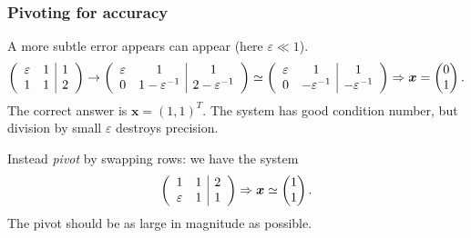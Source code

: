 \documentclass{beamer}
\newcommand{\bx}{{\boldsymbol{x}}}
\begin{document}
\begin{frame}
  \frametitle{Pivoting for accuracy}
  
  A more subtle error appears can appear (here $\varepsilon \ll 1$).
  {\footnotesize
  \begin{equation*}
    \left(
      \begin{array}{c c|c}
        \varepsilon & 1 & 1 \\
        1 & 1 & 2
      \end{array}
      \right) \rightarrow     
      \left(
      \begin{array}{c c|c}
        \varepsilon & 1 & 1 \\
        0 & 1 - \varepsilon^{-1} & 2 - \varepsilon^{-1}
      \end{array}
    \right) \simeq
    \left(
      \begin{array}{c c|c}
        \varepsilon & 1 & 1 \\
        0 & - \varepsilon^{-1} & - \varepsilon^{-1}
      \end{array}
    \right) \Rightarrow \bx  =
    \begin{pmatrix}
      0 \\ 1
    \end{pmatrix}.
  \end{equation*}} \pause
  The correct answer is $\bx = (1, 1)^T$. The  system has good
  condition number, but division by small $\varepsilon$ destroys
  precision. \pause
  
  \vspace{1ex}

  Instead \emph{pivot} by swapping rows: we have the system
  \begin{equation*}
    \left(
      \begin{array}{c c|c}
        1 & 1 & 2 \\
        \varepsilon & 1 & 1 
      \end{array}
    \right)  \Rightarrow \bx \simeq
    \begin{pmatrix}
      1 \\ 1
    \end{pmatrix}.
  \end{equation*}
  The pivot should be as large in magnitude as possible.

\note{

}
\end{frame}
\end{document}
